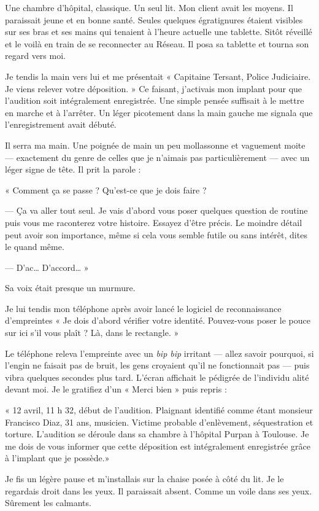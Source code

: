 Une chambre d'hôpital, classique. Un seul lit. Mon client avait les moyens. Il paraissait jeune et en bonne santé.
Seules quelques égratignures étaient visibles sur ses bras et ses mains qui tenaient à l'heure actuelle une tablette.
Sitôt réveillé et le voilà en train de se reconnecter au Réseau. Il posa sa tablette et tourna son regard vers moi.

Je tendis la main vers lui et me présentait « Capitaine Tersant, Police Judiciaire. Je viens relever votre déposition.
» Ce faisant, j'activais mon implant pour que l'audition soit intégralement enregistrée. Une simple pensée suffisait à
le mettre en marche et à l'arrêter. Un léger picotement dans la main gauche me signala que l'enregistrement avait
débuté.

Il serra ma main. Une poignée de main un peu mollassonne et vaguement moite — exactement du genre de celles que je
n'aimais pas particulièrement — avec un léger signe de tête. Il prit la parole :

« Comment ça se passe ? Qu'est-ce que je dois faire ?

— Ça va aller tout seul. Je vais d'abord vous poser quelques question de routine puis vous me raconterez votre
histoire. Essayez d'être précis. Le moindre détail peut avoir son importance, même si cela vous semble futile ou sans
intérêt, dites le quand même.

— D'ac… D'accord… »

Sa voix était presque un murmure.

Je lui tendis mon téléphone après avoir lancé le logiciel de reconnaissance d'empreintes « Je dois d'abord vérifier
votre identité. Pouvez-vous poser le pouce sur ici s'il vous plaît ? Là, dans le rectangle. »

Le téléphone releva l'empreinte avec un \emph{bip bip} irritant — allez savoir pourquoi, si l'engin ne faisait pas de
bruit, les gens croyaient qu'il ne fonctionnait pas — puis vibra quelques secondes plus tard. L'écran affichait le
pédigrée de l'individu alité devant moi. Je le gratifiez d'un « Merci bien » puis repris :

« 12 avril, 11 h 32, début de l'audition. Plaignant identifié comme étant monsieur Francisco Diaz, 31 ans, musicien.
Victime probable d'enlèvement, séquestration et torture. L'audition se déroule dans sa chambre à l'hôpital Purpan à 
Toulouse. Je me dois de vous informer que cette déposition est intégralement enregistrée grâce à l'implant que je 
possède.»

Je fis un légère pause et m'installais sur la chaise posée à côté du lit. Je le regardais droit dans les yeux. Il
paraissait absent. Comme un voile dans ses yeux. Sûrement les calmants.

